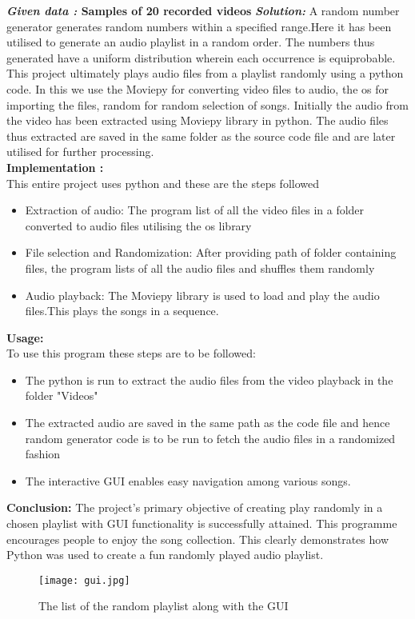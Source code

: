 \documentclass[journal,12pt,twocolumn]{IEEEtran}
\begin{document}
\textbf{\emph{Given data :} Samples of 20 recorded videos  }
\newline
\newline
{\textbf{ \emph{Solution:}} A random number generator generates random numbers within a specified range.Here it has been utilised to generate an audio playlist in a random order. The numbers thus generated have a uniform distribution wherein each occurrence is equiprobable.}
{
This project ultimately plays audio files from a playlist randomly using a python code. In this we use the Moviepy for converting video files to audio, the os for importing the files, random for random selection of songs.
Initially the audio from the video has been extracted using Moviepy library in python.
The audio files thus extracted are saved in the same folder as the source code file and are later utilised for further processing.
}\\
 \textbf{Implementation :}\\
 This entire project uses python and these are the steps followed \\
 \begin{itemize}
     \item Extraction of audio: The program list of all the video files in a folder converted to audio files utilising the os library \\ 
  \item File selection and Randomization: After providing path of folder containing files, the program lists of all the audio files and shuffles them randomly \\
   \item Audio playback: The Moviepy library is used to load and play the audio files.This plays the songs in a sequence.
 
 \end{itemize}
 \textbf{Usage:} \\
To use this program these steps are to be followed: \\
\begin{itemize}
    
  \item The python is run to extract the audio files from the video playback in the folder "Videos" \\
 \item The extracted audio are saved in the same path as the code file and hence random generator code is to be run to fetch the audio files in a randomized fashion \\
 \item The interactive GUI enables easy navigation among various songs. 
\end{itemize}

\textbf{Conclusion:} 
The project's primary objective of creating play randomly in a chosen playlist with GUI functionality is successfully attained.
This programme encourages people to enjoy the song collection. This clearly demonstrates how Python was used to create a fun randomly played audio playlist.
\begin{figure}[h]
    \centering
    \texttt{[image: gui.jpg]}
    \caption{The list of the random playlist along with the GUI}
    \label{fig:my_label}
\end{figure}
\end{document}
